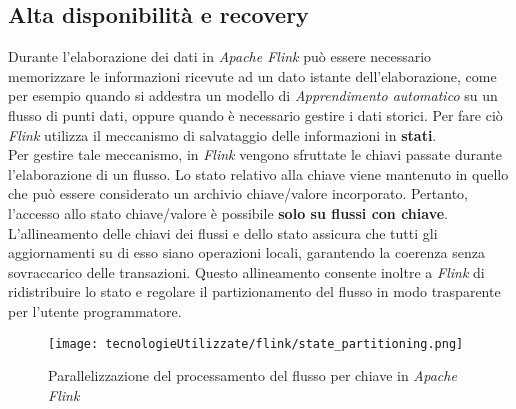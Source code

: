 \subsection{Alta disponibilità e recovery}
Durante l'elaborazione dei dati in \textit{Apache Flink} può essere necessario memorizzare le informazioni ricevute ad un dato istante dell'elaborazione, come per esempio quando si addestra un modello di \textit{\gls{Apprendimento automatico}} su un flusso di punti dati, oppure quando è necessario gestire i dati storici. Per fare ciò \textit{Flink} utilizza il meccanismo di salvataggio delle informazioni in \textbf{stati}.\\
Per gestire tale meccanismo, in \textit{Flink} vengono sfruttate le chiavi passate durante l'elaborazione di un flusso. Lo stato relativo alla chiave viene mantenuto in quello che può essere considerato un archivio chiave/valore incorporato. Pertanto, l'accesso allo stato chiave/valore è possibile \textbf{solo su flussi con chiave}. L'allineamento delle chiavi dei flussi e dello stato assicura che tutti gli aggiornamenti su di esso siano operazioni locali, garantendo la coerenza senza sovraccarico delle transazioni. Questo allineamento consente inoltre a \textit{Flink} di ridistribuire lo stato e regolare il partizionamento del flusso in modo trasparente per l'utente programmatore.

\begin{figure}[H] 
    \centering 
    \texttt{[image: tecnologieUtilizzate/flink/state\_partitioning.png]} 
    \caption{Parallelizzazione del processamento del flusso per chiave in \textit{Apache Flink}}
\end{figure}

